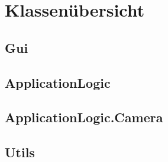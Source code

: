 \section{Klassenübersicht}

\subsection{Gui}

\newpage


\newpage


\newpage


\newpage


\newpage


\newpage


\newpage

\subsection{ApplicationLogic}

\newpage


\newpage


\newpage


\newpage


\newpage


\newpage

\subsection{ApplicationLogic.Camera}

\newpage


\newpage


\newpage


\newpage

\subsection{Utils}

